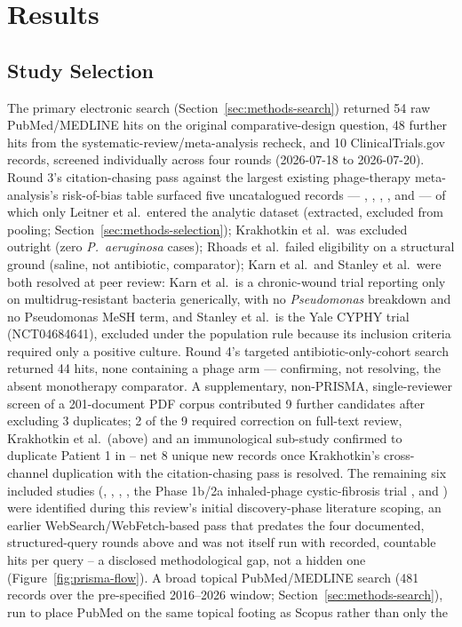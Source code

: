 \section{Results}
\label{sec:results}

\subsection{Study Selection}
\label{sec:results-selection}

The primary electronic search (Section~\ref{sec:methods-search}) returned 54 raw PubMed/MEDLINE hits on the original comparative-design question, 48 further hits from the systematic-review/meta-analysis recheck, and 10 ClinicalTrials.gov records, screened individually across four rounds (2026-07-18 to 2026-07-20). Round 3's citation-chasing pass against the largest existing phage-therapy meta-analysis's risk-of-bias table \parencite{Liu2025_ijaa} surfaced five uncatalogued records --- \textcite{Krakhotkin2025_currurol}, \textcite{Leitner2021_lancetid_pyophage}, \textcite{Karn2024_ijlew}, \textcite{Rhoads2009_jwoundcare}, and \textcite{Stanley2025_themicrobe_cyphy} --- of which only Leitner et al.\ entered the analytic dataset (extracted, excluded from pooling; Section~\ref{sec:methods-selection}); Krakhotkin et al.\ was excluded outright (zero \textit{P.\ aeruginosa} cases); Rhoads et al.\ failed eligibility on a structural ground (saline, not antibiotic, comparator); Karn et al.\ and Stanley et al.\ were both resolved at peer review: Karn et al.\ is a chronic-wound trial reporting only on multidrug-resistant bacteria generically, with no \textit{Pseudomonas} breakdown and no Pseudomonas MeSH term, and Stanley et al.\ is the Yale CYPHY trial (NCT04684641), excluded under the population rule because its inclusion criteria required only a positive culture. Round 4's targeted antibiotic-only-cohort search returned 44 hits, none containing a phage arm --- confirming, not resolving, the absent monotherapy comparator. A supplementary, non-PRISMA, single-reviewer screen of a 201-document PDF corpus contributed 9 further candidates after excluding 3 duplicates; 2 of the 9 required correction on full-text review, Krakhotkin et al.\ (above) and an immunological sub-study \parencite{Dan2023_jid} confirmed to duplicate Patient 1 in \textcite{Aslam2019_ajt} -- net 8 unique new records once Krakhotkin's cross-channel duplication with the citation-chasing pass is resolved. The remaining six included studies (\textcite{Pirnay2024_natmicrobiol}, \textcite{Onallah2023_med}, \textcite{Weiner2025_natcomms}, \textcite{Jault2019_phagoburn}, the Phase 1b/2a inhaled-phage cystic-fibrosis trial \parencite{Armata_swarmpa}, and \textcite{Aslam2019_ajt}) were identified during this review's initial discovery-phase literature scoping, an earlier WebSearch/WebFetch-based pass that predates the four documented, structured-query rounds above and was not itself run with recorded, countable hits per query -- a disclosed methodological gap, not a hidden one (Figure~\ref{fig:prisma-flow}). A broad topical PubMed/MEDLINE search (481 records over the pre-specified 2016--2026 window; Section~\ref{sec:methods-search}), run to place PubMed on the same topical footing as Scopus rather than only the 